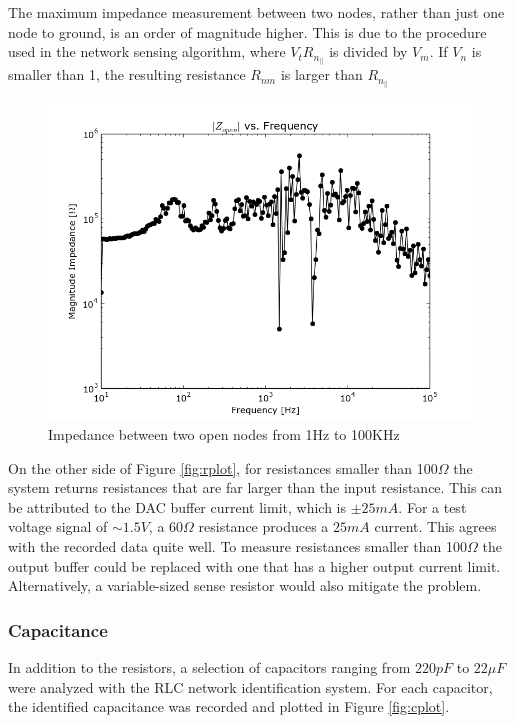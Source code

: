\documentclass[11pt,twoside]{mitthesis}
\newcommand{\ohm}{$\Omega$ }
\begin{document}
The maximum impedance measurement between two nodes, rather than just one node to ground, is an order of magnitude higher.
This is due to the procedure used in the network sensing algorithm, where $V_t R_{n_{||}}$ is divided by $V_m$.
If $V_n$ is smaller than 1, the resulting resistance $R_{nm}$ is larger than $R_{n_{||}}$

\begin{figure}[h]
	\label{fig:z2open}
  \begin{center}
      \includegraphics[width=.7\textwidth]{../zopen.png}
      \caption{Impedance between two open nodes from 1Hz to 100KHz}
  \end{center}
\end{figure}

On the other side of Figure \ref{fig:rplot}, for resistances smaller than 100\ohm the system returns resistances that are far larger than the input resistance.
This can be attributed to the DAC buffer current limit, which is $\pm25mA$.
For a test voltage signal of $\sim1.5V$, a 60\ohm resistance produces a $25mA$ current.
This agrees with the recorded data quite well.
To measure resistances smaller than 100\ohm the output buffer could be replaced with one that has a higher output current limit.
Alternatively, a variable-sized sense resistor would also mitigate the problem.

\subsubsection{Capacitance}

In addition to the resistors, a selection of capacitors ranging from $220pF$ to $22\mu F$ were analyzed with the RLC network identification system.  
For each capacitor, the identified capacitance was recorded and plotted in Figure \ref{fig:cplot}.
\end{document}
